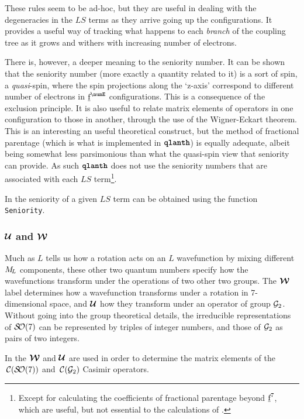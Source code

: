 \documentclass{article}
\newcommand{\codetext}[1]{{\color{BlueViolet} \texttt{#1}}}
\begin{document}
These rules seem to be ad-hoc, but they are useful in dealing with the degeneracies in the $LS$ terms as they arrive going up the configurations. It provides a useful way of tracking what happens to each \textit{branch} of the coupling tree as it grows and withers with increasing number of electrons.

There is, however, a deeper meaning to the seniority number. It can be shown that the seniority number (more exactly a quantity related to it) is a sort of spin, a \textit{quasi}-spin, where the spin projections along the `z-axis' correspond to different number of electrons in $\forb^\numE$ configurations. This is a consequence of the exclusion principle. It is also useful to relate matrix elements of operators in one configuration to those in another, through the use of the Wigner-Eckart theorem. This is an interesting an useful theoretical construct, but the method of fractional parentage (which is what is implemented in $\textbf{\texttt{qlanth}}$) is equally adequate, albeit being somewhat less parsimonious than what the quasi-spin view that seniority can provide. As such $\textbf{\texttt{qlanth}}$ does not use the seniority numbers that are associated with each $LS$ term\footnote{Except for calculating the coefficients of fractional parentage beyond $\underbar{$\text{f}$}^7$, which are useful, but not essential to the calculations of \qlanth.}.

In \qlanth the seniority of a given $LS$ term can be obtained using the function \codetext{Seniority}.

 

\subsubsection{$\boldsymbol{\mathcal{U}}$ and $\boldsymbol{\mathcal{W}}$}

Much as $L$ tells us how a rotation acts on an $L$ wavefunction by mixing different $M_{\!{L}}$ components, these other two quantum numbers specify how the wavefunctions transform under the operations of two other two groups. The $\boldsymbol{\mathcal{W}}$ label determines how a wavefunction transforms under a rotation in 7-dimensional space, and $\boldsymbol{\mathcal{U}}$ how they transform under an operator of group $\mathcal{G}_2$. Without going into the group theoretical details, the irreducible representations of $\mathcal{S\!O}(7)$ can be represented by triples of integer numbers, and those of $\mathcal{G}_2$ as pairs of two integers.

In \qlanth the $\boldsymbol{\mathcal{W}}$ and $\boldsymbol{\mathcal{U}}$ are used in order to determine the matrix elements of the $\,\mathcal{C}(\mathcal{S\!O}(7))$ and $\,\mathcal{C}(\mathcal{G}_2)$ Casimir operators.
\end{document}
